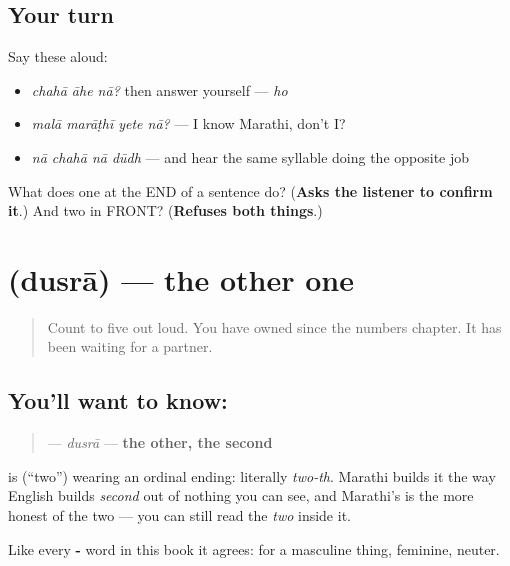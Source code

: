\subsection*{Your turn}
Say these aloud:

\begin{itemize}
\raggedright
  \item \emph{chahā āhe nā?} then answer yourself — \emph{ho}
  \item \emph{malā marāṭhī yete nā?} — I know Marathi, don't I?
  \item \emph{nā chahā nā dūdh} — and hear the same syllable doing the opposite job
\end{itemize}

\begin{tcolorbox}[breakable,colback=teal!4,colframe=teal!35!black,title={Before you move on}]
What does one \textbf{} at the END of a sentence do? (\textbf{Asks the listener to confirm it}.) And two \textbf{} in FRONT? (\textbf{Refuses both things}.)
\end{tcolorbox}
\section[\texorpdfstring{\mr{दुसरा} (dusrā)}{दुसरा (dusrā)}]{ (dusrā) — the other one}

\label{lesson:MR-C31-dusra}



\begin{quote}
Count to five out loud. You have owned \textbf{} since the numbers chapter. It has been waiting for a partner.
\end{quote}

\subsection*{You'll want to know: }
\begin{quote}
\textbf{} — \emph{dusrā} — \textbf{the other, the second}
\end{quote}

\textbf{} is \textbf{} (\textquotedblleft{}two\textquotedblright{}) wearing an ordinal ending: literally \emph{two-th}. Marathi builds it the way English builds \emph{second} out of nothing you can see, and Marathi's is the more honest of the two — you can still read the \emph{two} inside it.

Like every \textbf{-} word in this book it agrees: \textbf{} for a masculine thing, \textbf{} feminine, \textbf{} neuter.

